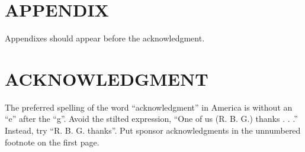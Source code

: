 \documentclass[letterpaper, 10 pt, conference]{ieeeconf}  %
\begin{document}
\section*{APPENDIX}

Appendixes should appear before the acknowledgment.

\section*{ACKNOWLEDGMENT}

The preferred spelling of the word ``acknowledgment'' in America is without an ``e'' after the ``g''. Avoid the stilted expression, ``One of us (R. B. G.) thanks . . .''  Instead, try ``R. B. G. thanks''. Put sponsor acknowledgments in the unnumbered footnote on the first page.






\end{document}
